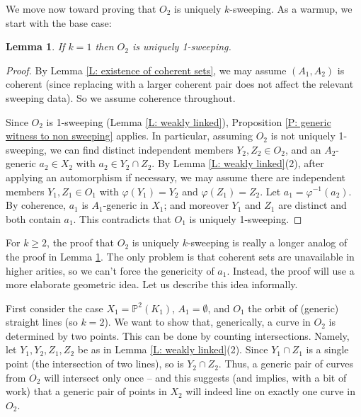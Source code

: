 \documentclass{amsart}
\newtheorem{lemma}[theorem]{Lemma}
\theoremstyle{definition}
\begin{document}
    We move now toward proving that $O_2$ is uniquely $k$-sweeping. As a warmup, we start with the base case:

    \begin{lemma}\label{L: link existence base case}
        If $k=1$ then $O_2$ is uniquely 1-sweeping.
    \end{lemma}
    \begin{proof}
        By Lemma \ref{L: existence of coherent sets}, we may assume $(A_1,A_2)$ is coherent (since replacing with a larger coherent pair does not affect the relevant sweeping data). So we assume coherence throughout.
        
        Since $O_2$ is 1-sweeping (Lemma \ref{L: weakly linked}), Proposition \ref{P: generic witness to non sweeping} applies. In particular, assuming $O_2$ is not uniquely 1-sweeping, we can find distinct independent members $Y_2,Z_2\in O_2$, and an $A_2$-generic $a_2\in X_2$ with $a_2\in Y_2\cap Z_2$. By Lemma \ref{L: weakly linked}(2), after applying an automorphism if necessary, we may assume there are independent members $Y_1,Z_1\in O_1$ with $\varphi(Y_1)=Y_2$ and $\varphi(Z_1)=Z_2$. Let $a_1=\varphi^{-1}(a_2)$. By coherence, $a_1$ is $A_1$-generic in $X_1$; and moreover $Y_1$ and $Z_1$ are distinct and both contain $a_1$. This contradicts that $O_1$ is uniquely 1-sweeping.
    \end{proof}

   For $k\geq 2$, the proof that $O_2$ is uniquely $k$-sweeping is really a longer analog of the proof in Lemma \ref{L: link existence base case}. The only problem is that coherent sets are unavailable in higher arities, so we can't force the genericity of $a_1$. Instead, the proof will use a more elaborate geometric idea. Let us describe this idea informally.
   
    First consider the case $X_1=\mathbb P^2(K_1)$, $A_1=\emptyset$, and $O_1$ the orbit of (generic) straight lines (so $k=2$). We want to show that, generically, a curve in $O_2$ is determined by two points. This can be done by counting intersections. Namely, let $Y_1,Y_2,Z_1,Z_2$ be as in Lemma \ref{L: weakly linked}(2). Since $Y_1\cap Z_1$ is a single point (the intersection of two lines), so is $Y_2\cap Z_2$. Thus, a generic pair of curves from $O_2$ will intersect only once -- and this suggests (and implies, with a bit of work) that a generic pair of points in $X_2$ will indeed line on exactly one curve in $O_2$.
\end{document}
